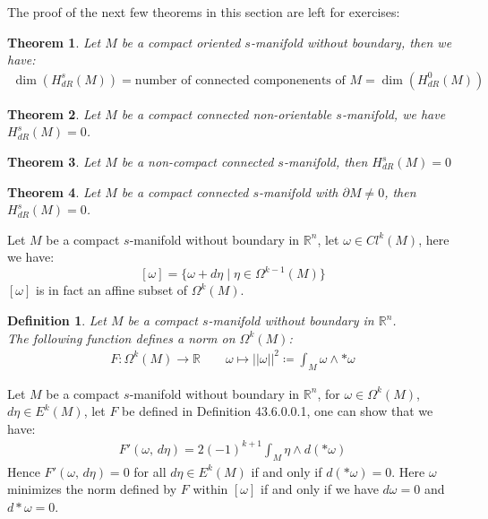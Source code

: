 \documentclass[15pt]{book}
\theoremstyle{break}
\theoremstyle{break}
\newtheorem{thm}{Theorem}[section]
\newtheorem{defn}{Definition}[corL]
\newcommand{\R}{\mathbb{R}}
\begin{document}
The proof of the next few theorems in this section are left for exercises:

\begin{thm}
Let $M$ be a compact oriented $s$-manifold without boundary, then we have:
\begin{align*}
\dim(H_{dR}^s (M) )= \text{number of connected componenents of }M = \dim(H_{dR}^0 (M))
\end{align*}
\end{thm}


\begin{thm}
Let $M$ be a compact connected non-orientable $s$-manifold, we have $H_{dR}^s(M) = 0$.
\end{thm}


\begin{thm}
Let $M$ be a non-compact connected $s$-manifold, then $H_{dR}^s(M) = 0$
\end{thm}

\begin{thm}
Let $M$ be a compact connected $s$-manifold with $\partial M\neq 0$, then $H_{dR}^s(M) = 0$.
\end{thm}

\hfill\break           
Let $M$ be a compact $s$-manifold without boundary in $\R^n$, let $\omega \in Cl^k(M)$, here we have:
$$[\omega] = \{ \omega + d\eta \mid \eta \in \Omega^{k-1}(M)\}$$ 
$[\omega]$ is in fact an affine subset of $\Omega^k(M)$. \\

\hfill\break
\begin{defn}
Let $M$ be a compact $s$-manifold without boundary in $\R^n$. \\
The following function defines a norm on $\Omega^k(M)$:
\begin{align*}
F: \Omega^k(M) \to \R \qquad \omega \mapsto ||\omega||^2 \coloneqq \int_M \omega \wedge * \omega 
\end{align*}
\end{defn}

\newpage
Let $M$ be a compact $s$-manifold without boundary in $\R^n$, for $\omega \in \Omega^k(M)$, $d\eta \in E^k(M)$, let $F$ be defined in Definition 43.6.0.0.1, one can show that we have:
\begin{align*}
F'(\omega,\, d\eta) = 2(-1)^{k+1} \int_M \eta \wedge d(*\omega)
\end{align*}
Hence $F'(\omega, \, d\eta) = 0$ for all $d\eta \in E^k(M)$ if and only if $d(*\omega) = 0$. Here $\omega$ minimizes the norm defined by $F$ within $[\omega]$ if and only if we have $d\omega = 0$ and $d*\omega =0$. \\
\end{document}
